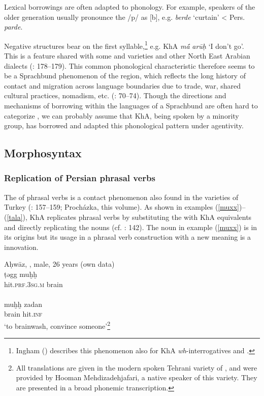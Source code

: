 \documentclass[output=paper,nonflat]{langsci/langscibook}
\begin{document}
Lexical borrowings are often adapted to  phonology. For example, speakers of the older generation usually pronounce the  /p/ as [b], e.g. \textit{berde} ‘curtain’ < Pers. \textit{parde}. 

Negative structures bear  on the first syllable,\footnote{Ingham (\citeyear[724]{Ingham1991}) describes this phenomenon also for KhA \textit{wh}-interrogatives and .} e.g. KhA \textit{mā́} \textit{arūḥ} ‘I don’t go’. This is a feature shared with some  and  varieties and other North East Arabian dialects (\citealt{Ingham2005}: 178–179). This common phonological characteristic therefore seems to be a Sprachbund phenomenon of the  region, which reflects the long history of contact and migration across language boundaries due to trade, war, shared cultural practices, nomadism, etc. (\citealt{Winford2003}: 70–74). Though the directions and mechanisms of borrowing within the languages of a Sprachbund are often hard to categorize \citep[74]{Winford2003}, we can probably assume that KhA, being spoken by a minority group, has borrowed and adapted this phonological  pattern under  agentivity.



\subsection{Morphosyntax}
\subsubsection{Replication of Persian phrasal verbs}

The  of phrasal verbs is a contact phenomenon also found in the  varieties of Turkey (\citealt{Grigore2007book}: 157–159; Procházka, this volume). As shown in examples (\ref{muxx})--(\ref{tala}), KhA replicates  phrasal verbs by substituting the   with KhA equivalents and directly replicating the  nouns (cf. \citealt{MatrasShabibi2007}: 142). The noun in example (\ref{muxx}) is  in its origins but its usage in a phrasal verb construction with a new meaning is a  innovation.

\ea \label{muxx}
\ea Aḥwāz, , male, 26 years (own data)\\
\gll ṭəgg muḫḫ\\
     hit.\textsc{prf}.3\textsc{sg}.\textsc{m} brain\\ 
\\
\gll muḫḫ zadan\\
     brain hit.\textsc{inf} \\
\glt ‘to brainwash, convince someone’\footnote{All  translations are given in the modern spoken Tehrani variety of , and were provided by Hooman Mehdizadehjafari, a native speaker of this variety. They are presented in a broad phonemic transcription.} 
\z
\z
\end{document}
